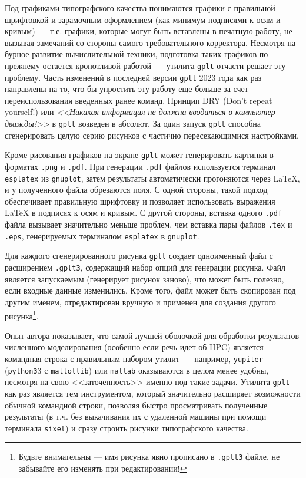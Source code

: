 \documentclass[12pt]{article}
\def\gplt{{\tt gplt}}
\def\gnuplot{{\tt gnuplot}}
\def\python{{\tt python3}}
\def\png{{\tt .png}}
\def\pdf{{\tt .pdf}}
\begin{document}
Под графиками типографского качества понимаются графики с правильной шрифтовкой и зарамочным оформлением (как минимум подписями к осям и кривым)~---
т.е. графики, которые могут быть вставлены в печатную
работу, не вызывая замечаний со стороны самого требовательного корректора. Несмотря на бурное развитие вычислительной техники, подготовка таких графиков по-прежнему
остается кропотливой работой~--- утилита \gplt{} отчасти решает эту проблему.
Часть изменений в последней версии \gplt{} 2023 года как раз направлены на то, что бы упростить эту работу
еще больше за счет переиспользования введенных ранее команд. Принцип DRY (Don’t repeat yourself!) или
{\it<<Никакая информация не должна вводиться в компьютер дважды!>>} в \gplt{} возведен в абсолют.
За один запуск \gplt{} способна сгенерировать целую серию рисунков с частично пересекающимися настройками.

Кроме рисования графиков на экране \gplt{} может генерировать картинки в форматах \png{} и \pdf.  При генерации \pdf{}  файлов используется терминал {\tt esplatex}
из \gnuplot, затем результаты автоматически прогоняются через \LaTeX{}, и у полученного файла обрезаются поля. С одной стороны, такой подход обеспечивает правильную
шрифтовку и позволяет использовать выражения \LaTeX{} в подписях к осям и кривым. С другой стороны, вставка одного \pdf{} файла вызывает
значительно меньше проблем, чем вставка пары файлов \verb'.tex' и \verb'.eps', генерируемых терминалом {\tt esplatex} в \gnuplot.

Для каждого сгенерированного рисунка \gplt{} создает одноименный  файл с расширением \verb'.gplt3', содержащий набор опций для генерации рисунка.
Файл является запускаемым (генерирует рисунок заново), что может быть полезно, если входные данные изменились.
Кроме того, файл может быть скопирован под другим именем, отредактирован вручную и применен для создания другого рисунка\footnote{Будьте внимательны ---
  имя рисунка явно прописано в {\tt .gplt3} файле, не забывайте его изменять при редактировании!}.

Опыт автора показывает, что самой лучшей оболочкой для обработки результатов численного моделирования (особенно если речь идет об HPC) является командная строка
с правильным набором утилит~--- например, \verb'yupiter' (\python3 с \verb'matlotlib') или \verb'matlab' оказываются в целом менее удобны, несмотря на свою <<заточенность>>
именно под такие задачи. Утилита   \gplt{} как раз является тем инструментом, который значительно расширяет возможности обычной командной строки,
позволяя быстро просматривать полученные результаты (в т.ч. без выкачивания их с удаленной машины при помощи терминала \verb'sixel')
и сразу строить рисунки типографского качества. 
\end{document}
